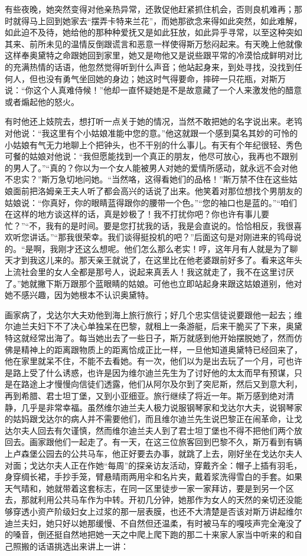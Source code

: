 \par 有些夜晚，她突然变得对他亲热异常，还敦促他赶紧抓住机会，否则良机难再；那时就得马上回到她家去“摆弄卡特来兰花”，而她那欲念来得如此突然，如此难解，如此迫不及待，她给他的那种种爱抚又是如此狂放，如此异乎寻常，以至这种突如其来、前所未见的温情反倒跟谎言和恶意一样使得斯万愁闷起来。有天晚上他就像这样奉奥黛特之命跟她回到家里，她又是吻他又是说些跟平常的冷漠恰成鲜明对比的充满热情的话语，他忽然觉得听到什么声音；他站起身来，到处寻找，没找到任何人，但也没有勇气坐回她的身边；她这时气得要命，摔碎一只花瓶，对斯万说：“你这个人真难侍候！”他却一直怀疑她是不是故意藏了一个人来激发他的醋意或者煽起他的怒火。
\par 有时他还上妓院去，想打听一点关于她的情况，当然不敢把她的名字说出来。老鸨对他说：“我这里有个小姑娘准能中您的意。”他这就跟一个感到莫名其妙的可怜的小姑娘有气无力地聊上个把钟头，也不干别的什么事儿。有天有个年纪很轻、秀色可餐的姑娘对他说：“我但愿能找到一个真正的朋友，他尽可放心，我再也不跟别的男人了。”“真的？你以为一个女人能被男人对她的爱情所感动，就永远不会对他不忠实？”斯万急切地问她。“当然咯，这得看她们的品格！”斯万禁不住在这些姑娘面前把洛姆亲王夫人听了都会高兴的话说了出来。他笑着对那位想找个男朋友的姑娘说：“你真好，你的眼睛蓝得跟你的腰带一个色。”“您的袖口也是蓝的。”“咱们在这样的地方谈这样的话，真是妙极了！我不打扰你吧？你也许有事儿要忙？”“不，我有的是时间。要是您打扰我的话，我是会直说的。恰恰相反，我很喜欢听您讲话。”“那我很荣幸。我们谈得挺投机的吧？”后面这句是对刚进来的鸨母说的。“是啊，我刚才还这么想呢。他们怎么那么老实！哼，这年月有人就是为了聊天才到我这儿来的。那天亲王就说了，在这里比在他老婆跟前好多了。看来这年头上流社会里的女人全都是那号人，说起来真丢人！我这就走了，我不在这里讨厌了。”她就撇下斯万跟那个蓝眼睛的姑娘。可他也立即站起身来跟这姑娘道别，他对她不感兴趣，因为她根本不认识奥黛特。
\par 画家病了，戈达尔大夫劝他到海上旅行旅行；好几个忠实信徒说要跟他一起去；维尔迪兰夫妇下不了决心单独呆在巴黎，就租上一条游艇，后来干脆买了下来，奥黛特这就经常出海了。每当她出去了一些日子，斯万就感到他开始摆脱她了，然而仿佛是精神上的距离跟物质上的距离恰成正比一样，一旦他知道奥黛特已经回来了，他在家里就呆不住，不能不去看她。有一次，他们以为是出去玩了一个月，可也许是路上受了什么诱惑，也许是因为维尔迪兰先生为了讨好他的太太而早有预谋，只是在路途上才慢慢向信徒们透露，他们从阿尔及尔到了突尼斯，然后又到意大利，再到希腊、君士坦丁堡，又到小亚细亚。旅行继续了将近一年。斯万感到绝对清静，几乎是非常幸福。虽然维尔迪兰夫人极力说服钢琴家和戈达尔大夫，说钢琴家的姑妈跟戈达尔的病人并不需要他们，而且维尔迪兰先生说巴黎正在闹革命，让戈达尔夫人回去有欠谨慎，然而维尔迪兰夫人到了君士坦丁堡也不得不把他们两个放回去。画家跟他们一起走了。有一天，在这三位旅客回到巴黎不久，斯万看到有辆上卢森堡公园去的公共马车，他正好要去办事，就跳了上去，刚好坐在戈达尔夫人对面；戈达尔夫人正在作她“每周”的探亲访友活动，穿戴齐全：帽子上插有羽毛，身穿绸长裙，手抄手笼，臂悬晴雨两用伞和名片夹，戴着浆洗得雪白的手套。如果天气晴和，她就带着这套标志，在同一区里徒步一家一家拜访，要是到另一个区去，那就利用公共马车作为中转。开初几分钟，她那作为女人的天然的亲切还没能够穿透小资产阶级妇女上过浆的那一层表膜，也还不大清楚是否该对斯万讲起维尔迪兰夫妇，她只好以她那缓慢、不自然但还温柔，有时被马车的嘎吱声完全淹没了的嗓音，倒还挺自然地把她一天之中爬上爬下跑的那二十来家人家当中听来的和自己照搬的话语挑选出来讲上一讲：
